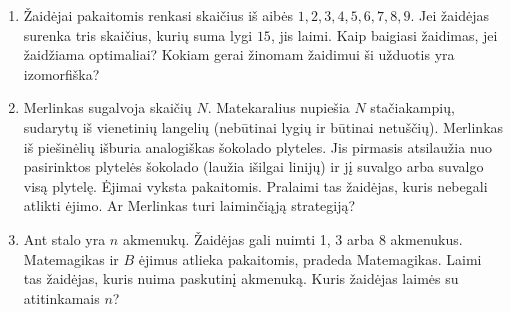 \begin{enumerate}

\item Žaidėjai pakaitomis renkasi skaičius iš aibės ${1, 2, 3, 4, 5, 6, 7,
  8, 9}$. Jei žaidėjas surenka tris skaičius, kurių suma lygi $15$, jis
  laimi.  Kaip baigiasi žaidimas, jei žaidžiama optimaliai? Kokiam gerai
  žinomam žaidimui ši užduotis yra izomorfiška?


\item Merlinkas sugalvoja skaičių $N$. Matekaralius nupiešia $N$
  stačiakampių, sudarytų iš vienetinių langelių (nebūtinai lygių ir būtinai
  netuščių). Merlinkas iš piešinėlių išburia analogiškas šokolado plyteles.
  Jis pirmasis atsilaužia nuo pasirinktos plytelės šokolado (laužia išilgai
  linijų) ir jį suvalgo arba suvalgo visą plytelę. Ėjimai vyksta
  pakaitomis. Pralaimi tas žaidėjas, kuris nebegali atlikti ėjimo.  Ar
  Merlinkas turi laiminčiąją strategiją?  


\item Ant stalo yra $n$ akmenukų. Žaidėjas gali nuimti 1, 3 arba 8
  akmenukus. Matemagikas ir $B$ ėjimus atlieka pakaitomis, pradeda
  Matemagikas.  Laimi tas žaidėjas, kuris nuima paskutinį akmenuką. Kuris
  žaidėjas laimės su atitinkamais $n$?



\end{enumerate}
